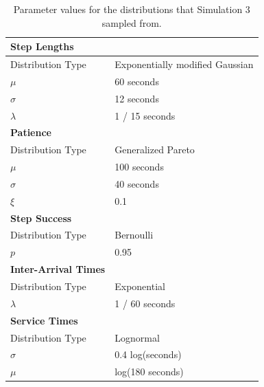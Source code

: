 \begin{table}
  \begin{tabular}{|l|l|}
    \hline
    \textbf{Step Lengths} & \\
    \hline
    Distribution Type & Exponentially modified Gaussian\\
    \hline
    $\mu$ & 60 seconds\\
    \hline
    $\sigma$ & 12 seconds\\
    \hline
    $\lambda$ & 1 / 15 seconds\\
    \hline
    \hline
    \textbf{Patience} & \\
    \hline
    Distribution Type & Generalized Pareto\\
    \hline
    $\mu$ & 100 seconds\\
    \hline
    $\sigma$ & 40 seconds\\
    \hline
    $\xi$ & 0.1\\
    \hline
    \hline
    \textbf{Step Success} & \\
    \hline
    Distribution Type & Bernoulli\\
    \hline
    $p$ & 0.95\\
    \hline
    \hline
    \textbf{Inter-Arrival Times} & \\
    \hline
    Distribution Type & Exponential\\
    \hline
    $\lambda$ & 1 / 60 seconds\\
    \hline
    \hline
    \textbf{Service Times} & \\
    \hline
    Distribution Type & Lognormal\\
    \hline
    $\sigma$ & 0.4 log(seconds)\\
    \hline
    $\mu$ & log(180 seconds)\\
    \hline
  \end{tabular}
  \caption{Parameter values for the distributions that Simulation 3 sampled
    from.}\label{tab:sim3_params}
\end{table}

